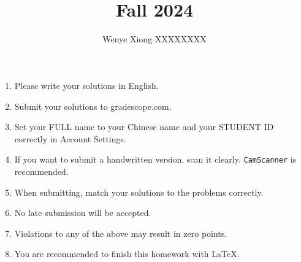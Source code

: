 \documentclass[11pt, addpoints, answers]{exam}
\title{
	\CourseName\\
	Fall 2024\\
	\HomeworkNO
}
\author{Wenye Xiong XXXXXXXX}
\date{\DueDate}
\newcommand{\ttt}{\texttt}
\begin{document}
\maketitle

\begin{enumerate}
	\item Please write your solutions in English.
	\item Submit your solutions to gradescope.com.
	\item Set your FULL name to your Chinese name and your STUDENT ID correctly in Account Settings.
	\item If you want to submit a handwritten version, scan it clearly. \ttt{CamScanner} is recommended.
	\item When submitting, match your solutions to the problems correctly.
	\item No late submission will be accepted.
	\item Violations to any of the above may result in zero points.
 	\item You are recommended to finish this homework with \LaTeX.
\end{enumerate}

\newpage

\begin{questions}
    
    
    \newpage
    
    
    
    \newpage
    
    
    
    \newpage

    

    \newpage

    

\end{questions}
\end{document}
